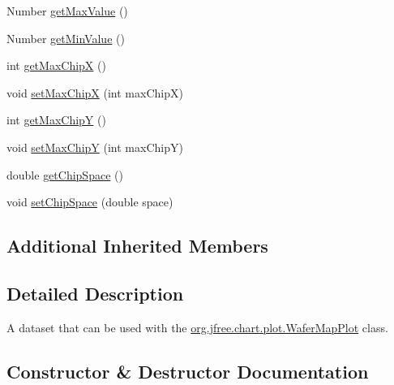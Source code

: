 \begin{DoxyCompactItemize}
Number \mbox{\hyperlink{classorg_1_1jfree_1_1data_1_1general_1_1_wafer_map_dataset_a1d7b8a2b9c25b22d479d5891da77bfa0}{get\+Max\+Value}} ()
\item 
Number \mbox{\hyperlink{classorg_1_1jfree_1_1data_1_1general_1_1_wafer_map_dataset_a82904fa8fb03ef55b39c48dc436efccb}{get\+Min\+Value}} ()
\item 
int \mbox{\hyperlink{classorg_1_1jfree_1_1data_1_1general_1_1_wafer_map_dataset_a46d2e874bcc902c4556e69decafd74e3}{get\+Max\+ChipX}} ()
\item 
void \mbox{\hyperlink{classorg_1_1jfree_1_1data_1_1general_1_1_wafer_map_dataset_a65bd2fe3150a4f8dd4edb2c33dd37484}{set\+Max\+ChipX}} (int max\+ChipX)
\item 
int \mbox{\hyperlink{classorg_1_1jfree_1_1data_1_1general_1_1_wafer_map_dataset_acff8ffd529d727b419b078d52ed1b96f}{get\+Max\+ChipY}} ()
\item 
void \mbox{\hyperlink{classorg_1_1jfree_1_1data_1_1general_1_1_wafer_map_dataset_ad2e0466ccd33f9a88edb541a724fbec8}{set\+Max\+ChipY}} (int max\+ChipY)
\item 
double \mbox{\hyperlink{classorg_1_1jfree_1_1data_1_1general_1_1_wafer_map_dataset_a2caa6cd8d77e0ef62ec1227527f4775c}{get\+Chip\+Space}} ()
\item 
void \mbox{\hyperlink{classorg_1_1jfree_1_1data_1_1general_1_1_wafer_map_dataset_a39b7f83004cb771e1fddc990876356e2}{set\+Chip\+Space}} (double space)
\end{DoxyCompactItemize}
\subsection*{Additional Inherited Members}


\subsection{Detailed Description}
A dataset that can be used with the \mbox{\hyperlink{classorg_1_1jfree_1_1chart_1_1plot_1_1_wafer_map_plot}{org.\+jfree.\+chart.\+plot.\+Wafer\+Map\+Plot}} class. 

\subsection{Constructor \& Destructor Documentation}
\mbox{\label{classorg_1_1jfree_1_1data_1_1general_1_1_wafer_map_dataset_a786393bc7ad90f79d5a7fda3522aaaad}} 
